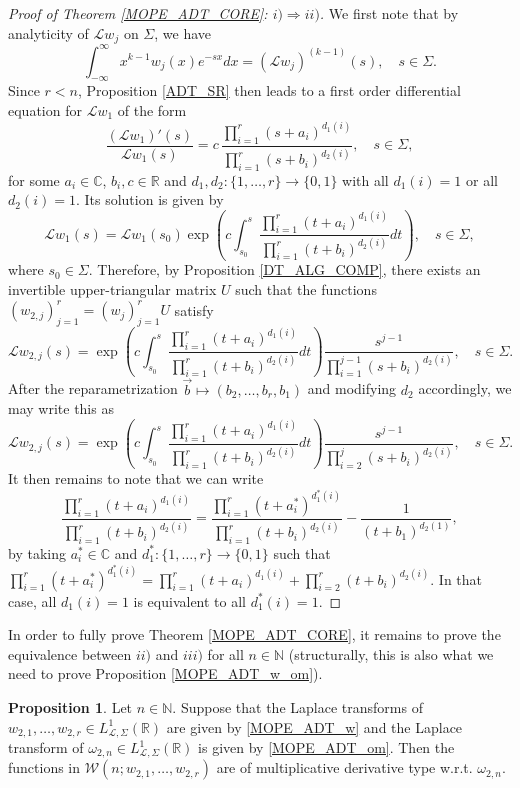 \documentclass[a4paper,12pt,oneside]{article}
\theoremstyle{definition}
\newtheorem{prop}[defi]{Proposition}
\newcommand{\N}{\mathbb{N}}
\newcommand{\C}{\mathbb{C}}
\newcommand{\R}{\mathbb{R}}
\newcommand{\om}{\omega}
\newcommand{\LT}[1]{\mathcal{L}#1}
\begin{document}
\begin{proof}[Proof of Theorem \ref{MOPE_ADT_CORE}: $i)\Rightarrow ii)$]
    We first note that by analyticity of $\LT{w_j}$ on $\Sigma$, we have
        $$ \int_{-\infty}^{\infty} x^{k-1}w_j(x) e^{-sx} dx = (\LT{w_j})^{(k-1)}(s),\quad s\in\Sigma. $$
    Since $r<n$, Proposition \ref{ADT_SR} then leads to a first order differential equation for $\LT{w_1}$ of the form
        $$ \frac{(\LT{w_1})'(s)}{\LT{w}_1(s)} = c \, \frac{\prod_{i=1}^{r} (s+a_i)^{d_1(i)}}{\prod_{i=1}^{r} (s+b_i)^{d_2(i)}},\quad s\in\Sigma,$$
    for some $a_i\in\C$, $b_i,c\in\R$ and $d_1,d_2:\{1,\dots,r\}\to\{0,1\}$ with all $d_1(i)=1$ or all $d_2(i)=1$. Its solution is given by
        $$ \LT{w}_1(s) = \LT{w}_1(s_0) \exp\left( c \int_{s_0}^{s} \frac{\prod_{i=1}^{r} (t+a_i)^{d_1(i)}}{\prod_{i=1}^{r} (t+b_i)^{d_2(i)}} dt \right),\quad s\in\Sigma,$$
    where $s_0\in\Sigma$. Therefore, by Proposition \ref{DT_ALG_COMP}, there exists an invertible upper-triangular matrix $U$ such that the functions $(w_{2,j})_{j=1}^r = (w_j)_{j=1}^r U$ satisfy
        $$ \LT{w_{2,j}}(s) = \exp\left( c \int_{s_0}^{s} \frac{\prod_{i=1}^{r} (t+a_i)^{d_1(i)}}{\prod_{i=1}^{r} (t+b_i)^{d_2(i)}} dt \right) \frac{s^{j-1}}{\prod_{i=1}^{j-1} (s+b_i)^{d_2(i)}},\quad s\in\Sigma.$$
    After the reparametrization $\vec{b}\mapsto (b_2,\dots,b_r,b_1)$ and modifying $d_2$ accordingly, we may write this as
    $$ \LT{w_{2,j}}(s) = \exp\left( c \int_{s_0}^{s} \frac{\prod_{i=1}^{r} (t+a_i)^{d_1(i)}}{\prod_{i=1}^{r} (t+b_i)^{d_2(i)}} dt \right) \frac{s^{j-1}}{\prod_{i=2}^{j} (s+b_i)^{d_2(i)}},\quad s\in\Sigma.$$
    It then remains to note that we can write
    $$\frac{\prod_{i=1}^{r} (t+a_i)^{d_1(i)}}{\prod_{i=1}^{r} (t+b_i)^{d_2(i)}} = \frac{\prod_{i=1}^{r} (t+a_i^\ast)^{d_1^\ast(i)}}{\prod_{i=1}^{r} (t+b_i)^{d_2(i)}} - \frac{1}{(t+b_1)^{d_2(1)}},$$
    by taking $a_i^\ast\in\C$ and $d_1^\ast:\{1,\dots,r\}\to\{0,1\}$ such that $ \prod_{i=1}^{r} (t+a_i^\ast)^{d_1^\ast(i)} = \prod_{i=1}^{r} (t+a_i)^{d_1(i)} + \prod_{i=2}^{r} (t+b_i)^{d_2(i)} $. In that case, all $d_1(i)=1$ is equivalent to all $d_1^\ast(i)=1$.
\end{proof}

In order to fully prove Theorem \ref{MOPE_ADT_CORE}, it remains to prove the equivalence between $ii)$ and $iii)$ for all $n\in\N$ (structurally, this is also what we need to prove Proposition \ref{MOPE_ADT_w_om}).

\begin{prop}
Let $n\in\N$. Suppose that the Laplace transforms of $w_{2,1},\dots,w_{2,r}\in L^{1}_{\LT{},\Sigma}(\R)$ are given by \eqref{MOPE_ADT_w} and the Laplace transform of $\om_{2,n}\in L^{1}_{\LT{},\Sigma}(\R)$ is given by \eqref{MOPE_ADT_om}. Then the functions in $\mathcal{W}(n;w_{2,1},\dots,w_{2,r})$ are of multiplicative derivative type w.r.t. $\om_{2,n}$.
\end{prop}
\end{document}
